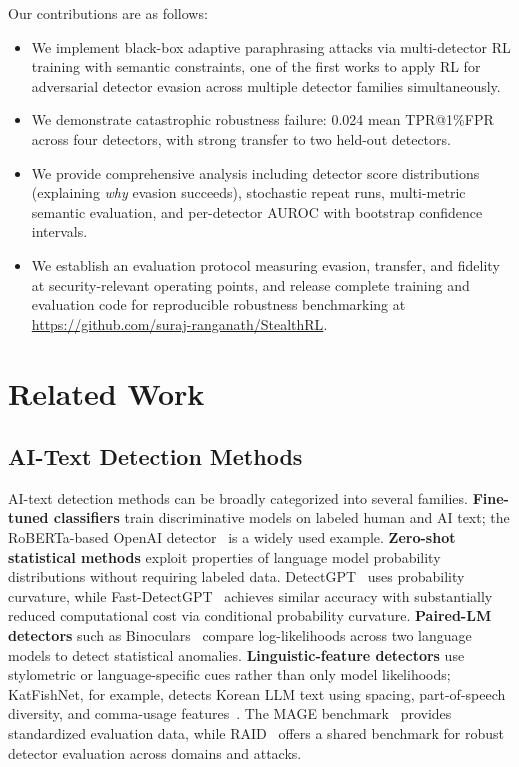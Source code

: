 \documentclass[11pt]{article}
\begin{document}
Our contributions are as follows:
\begin{itemize}[leftmargin=*,itemsep=2pt]
  \item We implement black-box adaptive paraphrasing attacks via multi-detector RL training with semantic constraints, one of the first works to apply RL for adversarial detector evasion across multiple detector families simultaneously.
  \item We demonstrate catastrophic robustness failure: 0.024 mean TPR@1\%FPR across four detectors, with strong transfer to two held-out detectors.
  \item We provide comprehensive analysis including detector score distributions (explaining \emph{why} evasion succeeds), stochastic repeat runs, multi-metric semantic evaluation, and per-detector AUROC with bootstrap confidence intervals.
  \item We establish an evaluation protocol measuring evasion, transfer, and fidelity at security-relevant operating points, and release complete training and evaluation code for reproducible robustness benchmarking at \url{https://github.com/suraj-ranganath/StealthRL}.
\end{itemize}

\section{Related Work}
\label{sec:related}

\subsection{AI-Text Detection Methods}

AI-text detection methods can be broadly categorized into several families. \textbf{Fine-tuned classifiers} train discriminative models on labeled human and AI text; the RoBERTa-based OpenAI detector~\cite{solaiman2019release} is a widely used example. \textbf{Zero-shot statistical methods} exploit properties of language model probability distributions without requiring labeled data. DetectGPT~\cite{mitchell2023detectgptzeroshotmachinegeneratedtext} uses probability curvature, while Fast-DetectGPT~\cite{bao2024fastdetectgptefficientzeroshotdetection} achieves similar accuracy with substantially reduced computational cost via conditional probability curvature. \textbf{Paired-LM detectors} such as Binoculars~\cite{hans2024spottingllmsbinocularszeroshot} compare log-likelihoods across two language models to detect statistical anomalies. \textbf{Linguistic-feature detectors} use stylometric or language-specific cues rather than only model likelihoods; KatFishNet, for example, detects Korean LLM text using spacing, part-of-speech diversity, and comma-usage features~\cite{park-etal-2025-katfishnet}. The MAGE benchmark~\cite{li2024magemachinegeneratedtextdetection} provides standardized evaluation data, while RAID~\cite{dugan2024raidsharedbenchmarkrobust} offers a shared benchmark for robust detector evaluation across domains and attacks.
\end{document}
